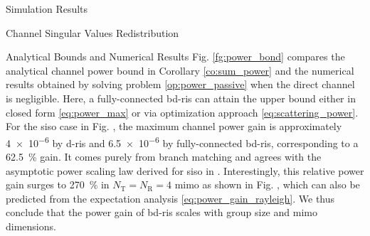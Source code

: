 \begin{section}{Simulation Results}
\begin{subsection}{Channel Singular Values Redistribution}
\begin{subsubsection}{Analytical Bounds and Numerical Results}
		 Fig. \ref{fg:power_bond} compares the analytical channel power bound in Corollary \ref{co:sum_power} and the numerical results obtained by solving problem \eqref{op:power_passive} when the direct channel is negligible.
		 Here, a fully-connected \gls{bd}-\gls{ris} can attain the upper bound either in closed form \eqref{eq:power_max} or via optimization approach \eqref{eq:scattering_power}.
		 For the \gls{siso} case in Fig. , the maximum channel power gain is approximately \num{4e-6} by \gls{d}-\gls{ris} and \num{6.5e-6} by fully-connected \gls{bd}-\gls{ris}, corresponding to a \qty{62.5}{\percent} gain.
		 It comes purely from branch matching and agrees with the asymptotic power scaling law derived for \gls{siso} in \cite[(30)]{Shen2020a}.
		 Interestingly, this relative power gain surges to \qty{270}{\percent} in $N_\mathrm{T}=N_\mathrm{R}=4$ \gls{mimo} as shown in Fig. , which can also be predicted from the expectation analysis \eqref{eq:power_gain_rayleigh}.
		 We thus conclude that the power gain of \gls{bd}-\gls{ris} scales with group size and \gls{mimo} dimensions.
	 \end{subsubsection}

 \end{subsection}


\end{section}
